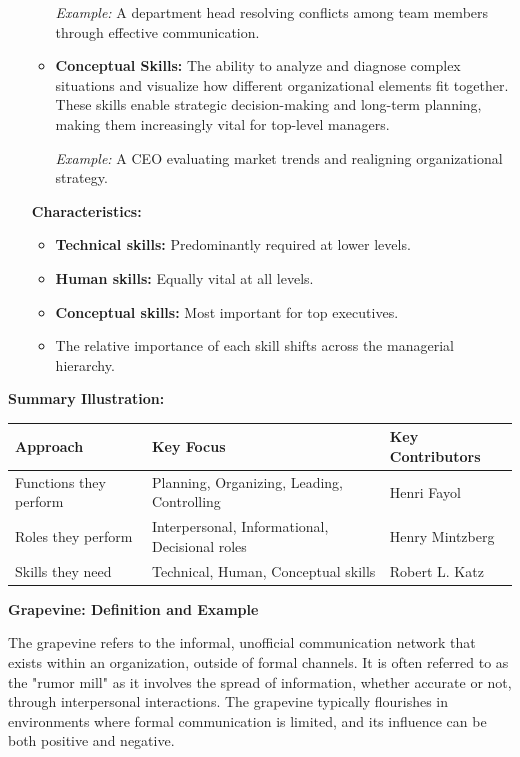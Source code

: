 \documentclass[10pt,a4paper]{book}
\begin{document}
\begin{enumerate}
\begin{itemize}
        \textit{Example:} A department head resolving conflicts among team members through effective communication.

        \item \textbf{Conceptual Skills:}
        The ability to analyze and diagnose complex situations and visualize how different organizational elements fit together. These skills enable strategic decision-making and long-term planning, making them increasingly vital for top-level managers.

        \textit{Example:} A CEO evaluating market trends and realigning organizational strategy.
    \end{itemize}

    \textbf{Characteristics:}
    \begin{itemize}
        \item \textbf{Technical skills:} Predominantly required at lower levels.
        \item \textbf{Human skills:} Equally vital at all levels.
        \item \textbf{Conceptual skills:} Most important for top executives.
        \item The relative importance of each skill shifts across the managerial hierarchy.
    \end{itemize}

\end{enumerate}

\textbf{Summary Illustration:}

\begin{tabular}{|p{5cm}|p{5cm}|p{5cm}|}
\hline
\textbf{Approach} & \textbf{Key Focus} & \textbf{Key Contributors} \\
\hline
Functions they perform & Planning, Organizing, Leading, Controlling & Henri Fayol \\
\hline
Roles they perform & Interpersonal, Informational, Decisional roles & Henry Mintzberg \\
\hline
Skills they need & Technical, Human, Conceptual skills & Robert L. Katz \\
\hline
\end{tabular}

\textbf{Grapevine: Definition and Example}

The grapevine refers to the informal, unofficial communication network that exists within an organization, outside of formal channels. It is often referred to as the "rumor mill" as it involves the spread of information, whether accurate or not, through interpersonal interactions. The grapevine typically flourishes in environments where formal communication is limited, and its influence can be both positive and negative. 
\end{document}
